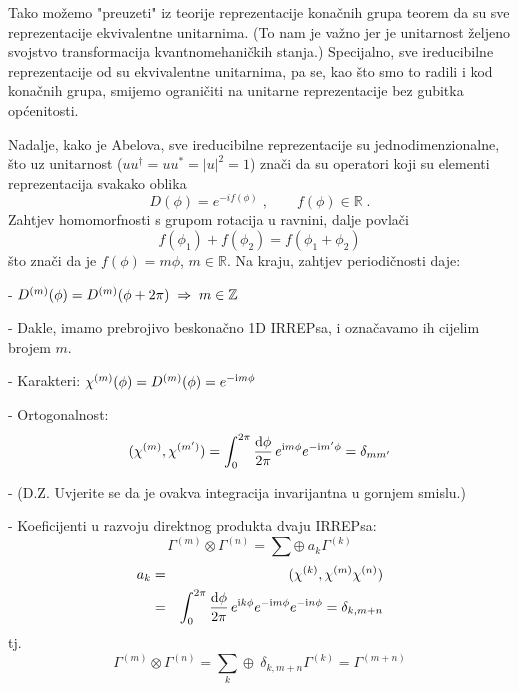 Tako možemo "preuzeti" iz teorije reprezentacije konačnih grupa
teorem da su sve reprezentacije ekvivalentne unitarnima. (To nam
 je važno jer je unitarnost željeno svojstvo transformacija kvantnomehaničkih
 stanja.)
Specijalno, sve ireducibilne reprezentacije od  su ekvivalentne unitarnima, pa se,
kao što smo to radili i kod konačnih grupa, smijemo ograničiti na
unitarne reprezentacije bez gubitka općenitosti. 

Nadalje, kako je  Abelova, sve ireducibilne reprezentacije
su jednodimenzionalne, što uz unitarnost 
($uu^\dagger = uu^* = |u|^2=1$) znači da su operatori koji
su elementi reprezentacija svakako oblika
\begin{equation}
D(\phi)=e ^{-i f(\phi)} \;, \qquad f(\phi) \in \mathbb{R} \;.
\end{equation}
Zahtjev homomorfnosti s grupom rotacija u ravnini, dalje povlači
\begin{equation}
   f(\phi_1)+f(\phi_2) = f(\phi_1+\phi_2)
\end{equation}
što znači da je $f(\phi)=m\phi$, $m\in\mathbb{R}$.
Na kraju, zahtjev periodičnosti daje:

- $D^{(m)}(\phi)=D^{(m)}(\phi + 2\pi) \;\Rightarrow\; m \in \mathbb{Z}$

- Dakle, imamo prebrojivo beskonačno 1D IRREPsa, i označavamo
  ih cijelim brojem $m$.

- Karakteri: $\chi^{(m)}(\phi)=D^{(m)}(\phi)=e^{-\textrm{\scriptsize i} m \phi}$

- Ortogonalnost:
\begin{displaymath}
(\chi^{(m)}, \chi^{(m')})=\int_{0}^{2\pi}\frac{\textrm{d} \phi}{2\pi}\,
 e^{\textrm{\scriptsize i} m \phi}e^{-\textrm{\scriptsize i} m' \phi} = \delta_{mm'}
\end{displaymath}

- (D.Z. Uvjerite se da je ovakva integracija invarijantna u gornjem smislu.)


- Koeficijenti u razvoju direktnog produkta dvaju IRREPsa:
\begin{displaymath}
  \Gamma^{(m)}\otimes\Gamma^{(n)} =
  \sum \oplus\: a_{k}\Gamma^{(k)} 
\end{displaymath}
\begin{eqnarray*}
a_{k} & = & (\chi^{(k)}, \chi^{(m)}\chi^{(n)}) \\
      & = & \int_{0}^{2\pi}\frac{\textrm{d} \phi}{2\pi}\,
    e^{\textrm{\scriptsize i} k \phi}e^{-\textrm{\scriptsize i} m \phi}e^{-\textrm{\scriptsize i} n \phi} = \delta_{k,m+n}
\end{eqnarray*}
tj.
\begin{displaymath}
  \Gamma^{(m)}\otimes\Gamma^{(n)} =
  \sum_{k} \oplus\: \delta_{k,m+n}\Gamma^{(k)} = \Gamma^{(m+n)}
\end{displaymath}


